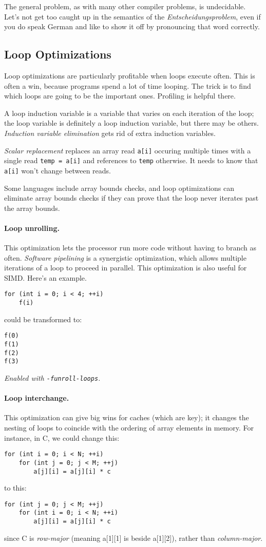The general problem, as with many other compiler problems, is undecidable. Let's not get too caught up in the semantics of the \textit{Entscheidungsproblem}, even if you do speak German and like to show it off by pronouncing that word correctly.  

\subsection*{Loop Optimizations}
Loop optimizations are particularly profitable when loops execute
often. This is often a win, because programs spend a lot of time looping.
The trick is to find which loops are going to be the important ones.
Profiling is helpful there.

A loop induction variable is a variable that varies on each iteration
of the loop; the loop variable is definitely a loop induction variable,
but there may be others. \emph{Induction variable elimination} gets
rid of extra induction variables.

\emph{Scalar replacement} replaces an array read {\tt a[i]}
occuring multiple times with a single read {\tt temp = a[i]} and references
to {\tt temp} otherwise. It needs to know that {\tt a[i]} won't change
between reads.

Some languages include array bounds checks, and loop optimizations
can eliminate array bounds checks if they can prove that the loop
never iterates past the array bounds.

\paragraph{Loop unrolling.} This optimization 
lets the processor run more code without having to branch 
as often. \emph{Software pipelining} is a synergistic optimization,
which allows multiple iterations of a loop to proceed in parallel.
This optimization is also useful for SIMD. Here's an example.
  \begin{verbatim}
for (int i = 0; i < 4; ++i)
    f(i)
  \end{verbatim}
could be transformed to:
  \begin{verbatim}
f(0)
f(1)
f(2)
f(3)
  \end{verbatim}
\noindent \emph{Enabled with {\tt -funroll-loops}.}

\paragraph{Loop interchange.} This optimization can give big wins
for caches (which are key); it changes the nesting of loops to
coincide with the ordering of array elements in memory. For instance,
in C, we could change this:
  \begin{verbatim}
for (int i = 0; i < N; ++i)
    for (int j = 0; j < M; ++j)
        a[j][i] = a[j][i] * c
  \end{verbatim}
to this:
  \begin{verbatim}
for (int j = 0; j < M; ++j)
    for (int i = 0; i < N; ++i)
        a[j][i] = a[j][i] * c
  \end{verbatim}
  since C is \emph{row-major} (meaning a[1][1] is beside a[1][2]),
rather than \emph{column-major}.

